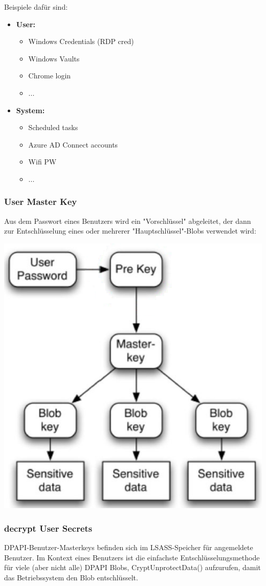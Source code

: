 Beispiele dafür sind:
\begin{itemize}
    \item \textbf{User:}
    \begin{itemize}
        \item Windows Credentials (RDP cred)
        \item Windows Vaults
        \item Chrome login
        \item ...
    \end{itemize}
    \item \textbf{System:}
    \begin{itemize}
        \item Scheduled tasks
        \item Azure AD Connect accounts
        \item Wifi PW
        \item ...
    \end{itemize}
\end{itemize}

\subsubsection{User Master Key}
Aus dem Passwort eines Benutzers wird ein "Vorschlüssel" abgeleitet, der dann zur Entschlüsselung eines oder mehrerer "Hauptschlüssel"-Blobs verwendet wird:
\begin{center}
    \vspace{-8pt}
    \includegraphics[width=.4\linewidth]{./img/05-mimikatz/dpapi_master_key}
    \vspace{-8pt}
\end{center}

\subsubsection{decrypt User Secrets}
DPAPI-Benutzer-Masterkeys befinden sich im LSASS-Speicher für angemeldete Benutzer. Im Kontext eines Benutzers ist die einfachste Entschlüsselungsmethode für viele (aber nicht alle) DPAPI Blobs, CryptUnprotectData() aufzurufen, damit das Betriebssystem den Blob entschlüsselt.

